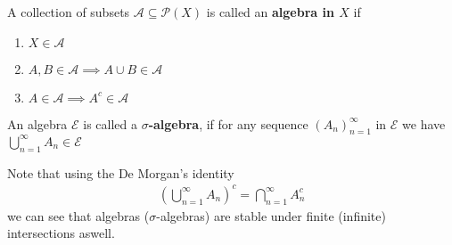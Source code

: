 \begin{dfn}
  A collection of subsets $\mathcal{A} \subseteq \mathcal{P}(X)$ is called an \textbf{algebra in $X$} if
  \begin{enumerate}
    \item $X \in \mathcal{A}$
    \item $A,B \in \mathcal{A} \implies A \cup B \in \mathcal{A}$
    \item $A\in \mathcal{A} \implies A^{c}\in \mathcal{A}$
  \end{enumerate}
  An algebra $\mathcal{E}$ is called a \textbf{$\sigma$-algebra}, if for any sequence $\left(A_{n}\right)_{n = 1}^{\infty}$ in $\mathcal{E}$ we have $\bigcup_{n=1}^{\infty}A_n \in \mathcal{E}$
\end{dfn}
Note that using the De Morgan's identity 
\begin{align*}
  \left(
    \bigcup_{n=1}^{\infty}A_n
  \right)^c
  =
  \bigcap_{n=1}^{\infty}A_n^c
\end{align*}
we can see that algebras ($\sigma$-algebras) are stable under finite (infinite) intersections aswell.




